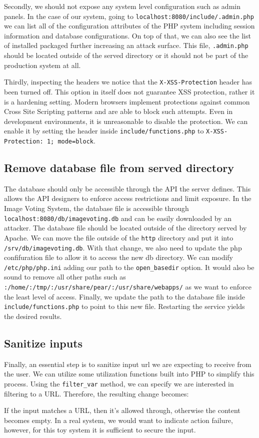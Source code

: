 \documentclass[a4paper, 12pt]{article}
\begin{document}
Secondly, we should not expose any system level configuration such as admin panels. In the case of our system, going to \texttt{localhost:8080/include/.admin.php} we can list all of the configuration attributes of the PHP system including session information and database configurations. On top of that, we can also see the list of installed packaged further increasing an attack surface. This file, \texttt{.admin.php} should be located outside of the served directory or it should not be part of the production system at all.

Thirdly, inspecting the headers we notice that the \texttt{X-XSS-Protection} header has been turned off. This option in itself does not guarantee XSS protection, rather it is a hardening setting. Modern browsers implement protections against common Cross Site Scripting patterns and are able to block such attempts. Even in development environments, it is unreasonable to disable the protection. We can enable it by setting the header inside \texttt{include/functions.php} to \texttt{X-XSS-Protection: 1; mode=block}. 

\subsection*{Remove database file from served directory}
The database should only be accessible through the API the server defines. This allows the API designers to enforce access restrictions and limit exposure. In the Image Voting System, the database file is accessible through \texttt{localhost:8080/db/imagevoting.db} and can be easily downloaded by an attacker. The database file should be located outside of the directory served by Apache. We can move the file outside of the \texttt{http} directory and put it into \texttt{/srv/db/imagevoting.db}. With that change, we also need to update the php confifuration file to allow it to access the new db directory. We can modify \texttt{/etc/php/php.ini} adding our path to the \texttt{open\_basedir} option. It would also be sound to remove all other paths such as \texttt{:/home/:/tmp/:/usr/share/pear/:/usr/share/webapps/} as we want to enforce the least level of access. Finally, we update the path to the database file inside \texttt{include/functions.php} to point to this new file. Restarting the service yields the desired results.

\subsection*{Sanitize inputs}
Finally, an essential step is to sanitize input url we are expecting to receive from the user. We can utilize some utilization functions built into PHP to simplify this process. Using the \texttt{filter\_var} method, we can specify we are interested in filtering to a URL. Therefore, the resulting change becomes: 



If the input matches a URL, then it's allowed through, otherwise the content becomes empty. In a real system, we would want to indicate action failure, however, for this toy system it is sufficient to secure the input.


\newpage


\end{document}
